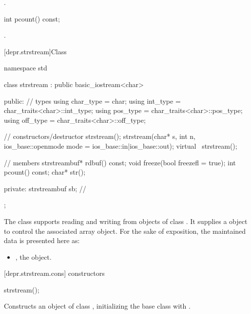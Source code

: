 \begin{itemdescr}
\pnum
\returns
{}.
\end{itemdescr}

%
\begin{itemdecl}
int pcount() const;
\end{itemdecl}

\begin{itemdescr}
\pnum
\returns
{}.
\end{itemdescr}

[depr.strstream]{Class }

%
\begin{codeblock}
namespace std {
  class strstream
    : public basic_iostream<char> {
  public:
    // types
    using char_type = char;
    using int_type  = char_traits<char>::int_type;
    using pos_type  = char_traits<char>::pos_type;
    using off_type  = char_traits<char>::off_type;

    // constructors/destructor
    strstream();
    strstream(char* s, int n,
              ios_base::openmode mode = ios_base::in|ios_base::out);
    virtual ~strstream();

    // members
    strstreambuf* rdbuf() const;
    void freeze(bool freezefl = true);
    int pcount() const;
    char* str();

  private:
    strstreambuf sb;  // \expos
  };
}
\end{codeblock}

\pnum
The class
supports reading and writing from objects of class
.
It supplies a
object to control the associated array object.
For the sake of exposition, the maintained data is presented here as:

\begin{itemize}
\item
{}, the  object.
\end{itemize}

[depr.strstream.cons]{ constructors}

%
\begin{itemdecl}
strstream();
\end{itemdecl}

\begin{itemdescr}
\pnum
\effects
Constructs an object of class
,
initializing the base class with
.
\end{itemdescr}

